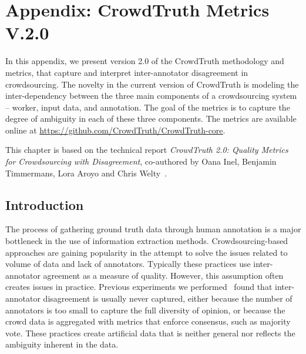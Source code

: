 
\manualmark
{}

\renewcommand{\thesection}{\Alph{section}}

\appendix

\chapter*{Appendix: CrowdTruth Metrics V.2.0}

In this appendix, we present version 2.0 of the CrowdTruth methodology and metrics, that capture and interpret inter-annotator disagreement in crowdsourcing. The novelty in the current version of CrowdTruth is modeling the inter-dependency between the three main components of a crowdsourcing system -- worker, input data, and annotation. The goal of the metrics is to capture the degree of ambiguity in each of these three components. The metrics are available online at \url{https://github.com/CrowdTruth/CrowdTruth-core}.

This chapter is based on the technical report \textit{CrowdTruth 2.0: Quality Metrics for Crowdsourcing with Disagreement}, co-authored by Oana Inel, Benjamin Timmermans, Lora Aroyo and Chris Welty~\cite{dumitrache2018crowdtruth}.

\section{Introduction}

The process of gathering ground truth data through human annotation is a major bottleneck in the use of information extraction methods. Crowdsourcing-based approaches are gaining popularity in the attempt to solve the issues related to volume of data and lack of annotators. Typically these practices use inter-annotator agreement as a measure of quality. However, this assumption often creates issues in practice. Previous experiments we performed~\cite{aroyo2013crowd} found that inter-annotator disagreement is usually never captured, either because the number of annotators is too small to capture the full diversity of opinion, or because the crowd data is aggregated with metrics that enforce consensus, such as majority vote.  These practices create artificial data that is neither general nor reflects the ambiguity inherent in the data.

